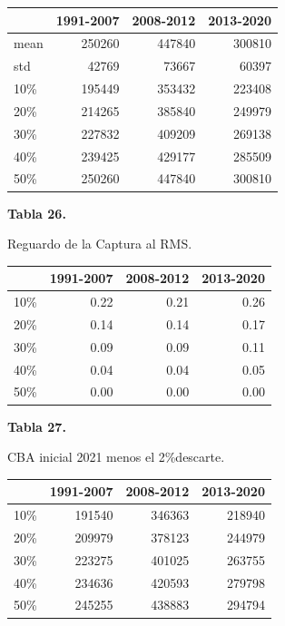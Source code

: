 \documentclass[
  spanish,
]{article}
\begin{document}
\begin{longtable}[]{@{}lrrr@{}}
\toprule
& 1991-2007 & 2008-2012 & 2013-2020\tabularnewline
\midrule
\endhead
mean & 250260 & 447840 & 300810\tabularnewline
std & 42769 & 73667 & 60397\tabularnewline
10\% & 195449 & 353432 & 223408\tabularnewline
20\% & 214265 & 385840 & 249979\tabularnewline
30\% & 227832 & 409209 & 269138\tabularnewline
40\% & 239425 & 429177 & 285509\tabularnewline
50\% & 250260 & 447840 & 300810\tabularnewline
\bottomrule
\end{longtable}

\vspace{-0.5cm}

\small
\begin{center} 
\textbf{Tabla 26.}
\end{center}
\begin{center} 
\vspace{-0.2cm} Reguardo de la Captura al RMS.
\end{center}
\vspace{-0.2cm}

\begin{longtable}[]{@{}lrrr@{}}
\toprule
& 1991-2007 & 2008-2012 & 2013-2020\tabularnewline
\midrule
\endhead
10\% & 0.22 & 0.21 & 0.26\tabularnewline
20\% & 0.14 & 0.14 & 0.17\tabularnewline
30\% & 0.09 & 0.09 & 0.11\tabularnewline
40\% & 0.04 & 0.04 & 0.05\tabularnewline
50\% & 0.00 & 0.00 & 0.00\tabularnewline
\bottomrule
\end{longtable}

\vspace{-0.5cm}

\small
\begin{center} 
\textbf{Tabla 27.}
\end{center}
\begin{center} 
\vspace{-0.2cm} CBA inicial 2021 menos el 2\%descarte. 
\end{center}
\vspace{-0.2cm}

\begin{longtable}[]{@{}lrrr@{}}
\toprule
& 1991-2007 & 2008-2012 & 2013-2020\tabularnewline
\midrule
\endhead
10\% & 191540 & 346363 & 218940\tabularnewline
20\% & 209979 & 378123 & 244979\tabularnewline
30\% & 223275 & 401025 & 263755\tabularnewline
40\% & 234636 & 420593 & 279798\tabularnewline
50\% & 245255 & 438883 & 294794\tabularnewline
\bottomrule
\end{longtable}
\end{document}
